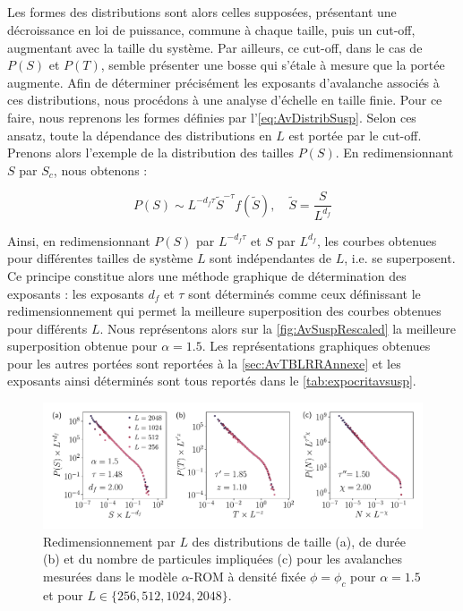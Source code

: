 \subparagraph{}Les formes des distributions sont alors celles supposées, présentant une décroissance en loi de puissance, commune à chaque taille, puis un cut-off, augmentant avec la taille du système. Par ailleurs, ce cut-off, dans le cas de $P(S)$ et $P(T)$, semble présenter une bosse qui s'étale à mesure que la portée augmente. Afin de déterminer précisément les exposants d'avalanche associés à ces distributions, nous procédons à une analyse d'échelle en taille finie. Pour ce faire, nous reprenons les formes définies par l'\autoref{eq:AvDistribSusp}. Selon ces ansatz, toute la dépendance des distributions en $L$ est portée par le cut-off. Prenons alors l'exemple de la distribution des tailles $P(S)$. En redimensionnant $S$ par $S_c$, nous obtenons :

\begin{equation}
	P(S) \sim L^{-d_f\tau}\tilde{S}^{-\tau}f\left( \tilde{S} \right),  \quad \tilde{S} = \frac{S}{L^{d_f}}
\end{equation}

\noindent Ainsi, en redimensionnant $P(S)$ par $L^{-d_f\tau}$ et $S$ par $L^{d_f}$, les courbes obtenues pour différentes tailles de système $L$ sont indépendantes de $L$, i.e. se superposent. Ce principe constitue alors une méthode graphique de détermination des exposants : les exposants $d_f$ et $\tau$ sont déterminés comme ceux définissant le redimensionnement qui permet la meilleure superposition des courbes obtenues pour différents $L$. Nous représentons alors sur la \autoref{fig:AvSuspRescaled} la meilleure superposition obtenue pour $\alpha = 1.5$. Les représentations graphiques obtenues pour les autres portées sont reportées à la \autoref{sec:AvTBLRRAnnexe} et les exposants ainsi déterminés sont tous reportés dans le \autoref{tab:expocritavsusp}.

\begin{figure}[h]
	\centering
	\includegraphics[width=\textwidth]{Chapitre3/Figures/Avalanches/Rescale_Av_alpha15.pdf}
	\caption{Redimensionnement par $L$ des distributions de taille (a), de durée (b) et du nombre de particules impliquées (c) pour les avalanches mesurées dans le modèle $\alpha$-ROM à densité fixée $\phi=\phi_c$ pour $\alpha = 1.5$ et pour $L \in \{ 256, 512, 1024, 2048 \}$.}
	\label{fig:AvSuspRescaled}
\end{figure}


